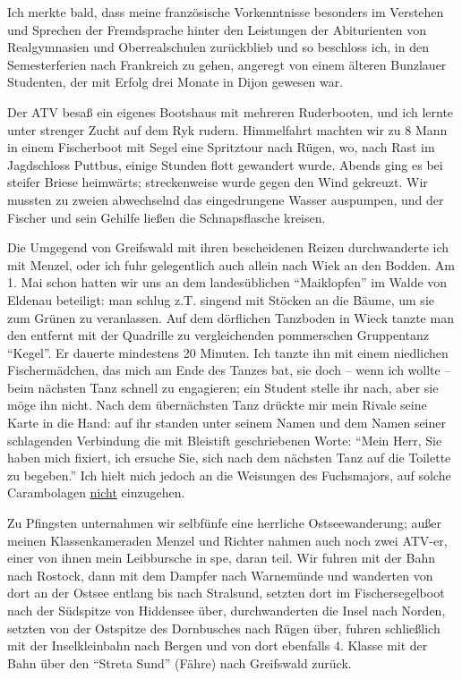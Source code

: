 \documentclass[a5paper,pagesize,10pt,twoside=true]{scrbook}
\begin{document}
Ich merkte bald, dass meine französische Vorkenntnisse besonders im Verstehen und Sprechen der Fremdsprache hinter den Leistungen der Abiturienten von Realgymnasien und Oberrealschulen zurückblieb und so beschloss ich, in den Semesterferien nach Frankreich zu gehen, angeregt von einem älteren Bunzlauer Studenten, der mit Erfolg drei Monate in Dijon gewesen war.

Der ATV besaß ein eigenes Bootshaus mit mehreren Ruderbooten, und ich lernte unter strenger Zucht auf dem Ryk rudern. Himmelfahrt machten wir zu 8 Mann in einem Fischerboot mit Segel eine Spritztour nach Rügen, wo, nach Rast im Jagdschloss Puttbus, einige Stunden flott gewandert wurde. Abends ging es bei steifer Briese heimwärts; streckenweise wurde gegen den Wind gekreuzt. Wir mussten zu zweien abwechselnd das eingedrungene Wasser auspumpen, und der Fischer und sein Gehilfe ließen die Schnapsflasche kreisen.

Die Umgegend von Greifswald mit ihren bescheidenen Reizen durchwanderte ich mit Menzel, oder ich fuhr gelegentlich auch allein nach Wiek an den Bodden. Am 1. Mai schon hatten wir uns an dem landesüblichen \enquote{Maiklopfen} im Walde von Eldenau beteiligt: man schlug z.T. singend mit Stöcken an die Bäume, um sie zum Grünen zu veranlassen. Auf dem dörflichen Tanzboden in Wieck tanzte man den entfernt mit der Quadrille zu vergleichenden pommerschen Gruppentanz \enquote{Kegel}. Er dauerte mindestens 20 Minuten. Ich tanzte ihn mit einem niedlichen Fischermädchen, das mich am Ende des Tanzes bat, sie doch -- wenn ich wollte -- beim nächsten Tanz schnell zu engagieren; ein Student stelle ihr nach, aber sie möge ihn nicht. Nach dem übernächsten Tanz drückte mir mein Rivale seine Karte in die Hand: auf ihr standen unter seinem Namen und dem Namen seiner schlagenden Verbindung die mit Bleistift geschriebenen Worte: \enquote{Mein Herr, Sie haben mich fixiert, ich ersuche Sie, sich nach dem nächsten Tanz auf die Toilette zu begeben.} Ich hielt mich jedoch an die Weisungen des Fuchsmajors, auf solche Carambolagen \underline{nicht} einzugehen.

Zu Pfingsten unternahmen wir selbfünfe eine herrliche Ostseewanderung; außer meinen Klassenkameraden Menzel und Richter nahmen auch noch zwei ATV-er, einer von ihnen mein Leibbursche in spe, daran teil. Wir fuhren mit der Bahn nach Rostock, dann mit dem Dampfer nach Warnemünde und wanderten von dort an der Ostsee entlang bis nach Stralsund, setzten dort im Fischersegelboot nach der Südspitze von Hiddensee über, durchwanderten die Insel nach Norden, setzten von der Ostspitze des Dornbusches nach Rügen über, fuhren schließlich mit der Inselkleinbahn nach Bergen und von dort ebenfalls 4. Klasse mit der Bahn über den \enquote{Streta Sund} (Fähre) nach Greifswald zurück.\\
\end{document}
